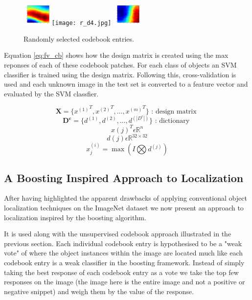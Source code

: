 \documentclass[10pt,twocolumn,letterpaper]{article}
\begin{document}
\begin{figure}[t]
\begin{center}
{                         \includegraphics[width=0.6in]{r_d3.jpg}\texttt{[image: r\_d4.jpg]}
                         \includegraphics[width=0.6in]{r_d5.jpg}
                        }
\end{center}
   \caption{Randomly selected codebook entries.}
\label{fig:unsupcodebook}
\end{figure}


Equation \ref{eq:fv_cb} shows how the design matrix is created using the max reponses of each of these codebook patches. 
For each class of objects an SVM classifier is trained using the design matrix.
Following this, cross-validation is used and each unknown image in the test set is converted to a feature vector and evaluated by the SVM classfier. 

\[\boldsymbol{X} = \{{x^{(1)}}^T,{x^{(2)}}^T,\ldots,{x^{(m)}}^T\} \text{ : design matrix } \]
\[\boldsymbol{D^c} = \{{d^{(1)}},{d^{(2)}},\ldots,{d^{(|D^c|)}}\} \text{ : dictionary } \]
\[ x(j)^T  \epsilon \mathbb{R}^n \]
\[ d(j)  \epsilon \mathbb{R}^{32 \times 32} \]
\begin{equation} 
    {x_j^{(i)}} = {\max}( I \bigotimes d^{(j)}) 
    \label{eq:fv_cb}
\end{equation}


\subsection{A Boosting Inspired Approach to Localization}

After having highlighted the apparent drawbacks of applying conventional object
localization techniques on the ImageNet dataset we now present an approach to
localization inspired by the boosting algorithm.  

It is used along with the unsupervised codebook approach illustrated in the previous section.
Each individual codebook entry is hypothesised to be a "weak vote" of where the
object instances within the image are located much like each codebook entry is a 
weak classifier in the boosting framework. Instead of simply taking the best response
of each codebook entry as a vote we take the top few responses on the image (the image here
is the entire image and not a positive or negative snippet) and weigh them by the value of
the response. 
\end{document}

